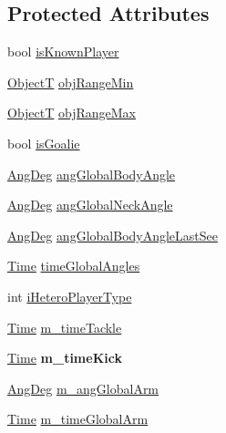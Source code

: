 \subsection*{Protected Attributes}
\begin{DoxyCompactItemize}
\item 
bool \hyperlink{classPlayerObject_a699d8554acd0197ba5393040bec150c4}{is\+Known\+Player}
\item 
\hyperlink{SoccerTypes_8h_ad4b701fa66e7d26c054ed15b7820c77c}{ObjectT} \hyperlink{classPlayerObject_a28e0c9103105adfd75b31192bd3f7027}{obj\+Range\+Min}
\item 
\hyperlink{SoccerTypes_8h_ad4b701fa66e7d26c054ed15b7820c77c}{ObjectT} \hyperlink{classPlayerObject_a2d42bf8573e4a7d6ade45b8395b84f50}{obj\+Range\+Max}
\item 
bool \hyperlink{classPlayerObject_a1e486f02cc1cd54d0c4dbf34b0146b06}{is\+Goalie}
\item 
\hyperlink{Geometry_8h_a6bfe02ae9bb185092902092561ab2865}{Ang\+Deg} \hyperlink{classPlayerObject_a1f6d18f264e9b817e9b96fbe88fe3782}{ang\+Global\+Body\+Angle}
\item 
\hyperlink{Geometry_8h_a6bfe02ae9bb185092902092561ab2865}{Ang\+Deg} \hyperlink{classPlayerObject_a98882a1394f93e2e72e3aeeb353129ab}{ang\+Global\+Neck\+Angle}
\item 
\hyperlink{Geometry_8h_a6bfe02ae9bb185092902092561ab2865}{Ang\+Deg} \hyperlink{classPlayerObject_a1d6d50f1bc562e21f3fb5ed93bfd389c}{ang\+Global\+Body\+Angle\+Last\+See}
\item 
\hyperlink{classTime}{Time} \hyperlink{classPlayerObject_aa734df386c6a0c55b28cd6530cbdb116}{time\+Global\+Angles}
\item 
int \hyperlink{classPlayerObject_a0a5a1732ec44a123c083ee7f71959354}{i\+Hetero\+Player\+Type}
\item 
\hyperlink{classTime}{Time} \hyperlink{classPlayerObject_aeb6b63098e15d4fb071a175c1240f83b}{m\+\_\+time\+Tackle}
\item 
\hyperlink{classTime}{Time} {\bfseries m\+\_\+time\+Kick}\hypertarget{classPlayerObject_a3e1ecfa81efdb3c8f1f47c92fb6f021c}{}\label{classPlayerObject_a3e1ecfa81efdb3c8f1f47c92fb6f021c}

\item 
\hyperlink{Geometry_8h_a6bfe02ae9bb185092902092561ab2865}{Ang\+Deg} \hyperlink{classPlayerObject_af93220d0f459af6f8fafa6c1a470fb09}{m\+\_\+ang\+Global\+Arm}
\item 
\hyperlink{classTime}{Time} \hyperlink{classPlayerObject_aefaa8321c6f8bb48527582212a5f2ac5}{m\+\_\+time\+Global\+Arm}
\end{DoxyCompactItemize}


